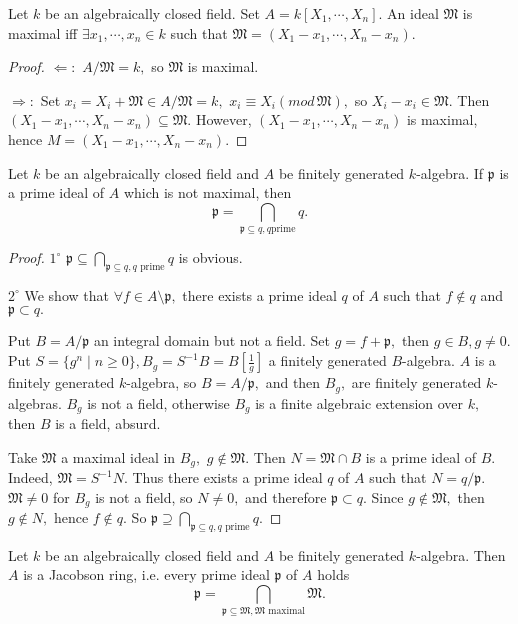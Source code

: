 \begin{cor}
Let $k$ be an algebraically closed field. Set $A=k[X_1,\cdots,X_n].$
An ideal $\mathfrak{M}$ is maximal iff $\exists x_1,\cdots,x_n\in k$
such that $\mathfrak{M}=(X_1-x_1,\cdots,X_n-x_n).$
\end{cor}
\begin{proof}
$\Longleftarrow:$ $A/\mathfrak{M}=k,$ so $\mathfrak{M}$ is maximal.

$\Longrightarrow:$ Set $x_i=X_i+\mathfrak{M}\in A/\mathfrak{M}=k,$
$x_i\equiv X_i(mod\,\mathfrak{M}),$ so $X_i-x_i\in \mathfrak{M}.$
Then $(X_1-x_1,\cdots,X_n-x_n)\subseteq \mathfrak{M}.$ However,
$(X_1-x_1,\cdots,X_n-x_n)$ is maximal, hence
$M=(X_1-x_1,\cdots,X_n-x_n).$
\end{proof}
\begin{cor}
Let $k$ be an algebraically closed field and $A$ be finitely
generated $k$-algebra. If $\mathfrak{p}$ is a prime ideal of $A$
which is not maximal, then
$$\mathfrak{p}=\bigcap\limits_{\mathfrak{p}\subseteq q, q\text{
prime}} q.$$
\end{cor}
\begin{proof}
$\mathit{1^{\circ}}$ $\mathfrak{p}\subseteq
\bigcap\limits_{\mathfrak{p}\subseteq q, q\text{ prime}} q$ is
obvious.

$\mathit{2^{\circ}}$ We show that $\forall f\in A\setminus
\mathfrak{p},$ there exists a prime ideal $q$ of $A$ such that
$f\not\in q$ and $\mathfrak{p}\subset q.$

Put $B=A/\mathfrak{p}$ an integral domain but not a field. Set
$g=f+\mathfrak{p},$ then $g\in B, g\neq 0.$ Put $S=\{g^n\mid
n\geqslant 0\}, B_g=S^{-1}B=B[\frac{1}{g}]$ a finitely generated
$B$-algebra. $A$ is a finitely generated $k$-algebra, so
$B=A/\mathfrak{p},$ and then $B_g,$ are finitely generated
$k$-algebras. $B_g$ is not a field, otherwise $B_g$ is a finite
algebraic extension over $k,$ then $B$ is a field, absurd.

Take $\mathfrak{M}$ a maximal ideal in $B_g,$ $g\not\in
\mathfrak{M}.$ Then $N=\mathfrak{M}\cap B$ is a prime ideal of $B.$
Indeed, $\mathfrak{M}= S^{-1}N.$ Thus there exists a prime ideal $q$
of $A$ such that $N=q/\mathfrak{p}.$ $\mathfrak{M}\neq 0$ for $B_g$
is not a field, so $N\neq 0,$ and therefore $\mathfrak{p}\subset q.$
Since $g\not\in \mathfrak{M},$ then $g\not\in N,$ hence $f\not\in
q.$ So $\mathfrak{p}\supseteq \bigcap\limits_{\mathfrak{p}\subseteq
q, q\text{ prime}} q.$
\end{proof}
\begin{cor}
Let $k$ be an algebraically closed field and $A$ be finitely
generated $k$-algebra. Then $A$ is a Jacobson ring, i.e. every prime
ideal $\mathfrak{p}$ of $A$ holds
$$\mathfrak{p}=\bigcap\limits_{\mathfrak{p}\subseteq \mathfrak{M},
\mathfrak{M}\text{ maximal}} \mathfrak{M}.$$
\end{cor}
